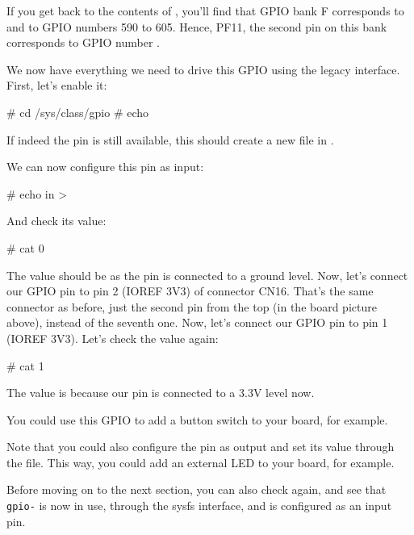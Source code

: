       If you get back to the contents of , you'll
      find that GPIO bank F corresponds to  and to GPIO
      numbers 590 to 605. Hence, PF11, the second pin on this bank corresponds to
      GPIO number \gpionum.
\fi

We now have everything we need to drive this GPIO using the legacy
interface. First, let's enable it:

\begin{bashinput}
# cd /sys/class/gpio
# echo %
\end{bashinput}

If indeed the pin is still available, this should create a new
\code{\gpioname} file in .

We can now configure this pin as input:

\begin{bashinput}
# echo in > %
\end{bashinput}

And check its value:

\begin{bashinput}
# cat %
0
\end{bashinput}

The value should be  as the pin is connected to a ground level.
\if{}
      Now, let's connect our GPIO pin to pin 2 (IOREF 3V3) of connector CN16.
      That's the same connector as before, just the second pin from the top
      (in the board picture above), instead of the seventh one.
\fi
\if{}
      Now, let's connect our GPIO pin to pin 1 (IOREF 3V3).
\fi
Let's check the value again:

\begin{bashinput}
# cat %
1
\end{bashinput}

The value is  because our pin is connected to a 3.3V level now.

You could use this GPIO to add a button switch to your board, for
example.

Note that you could also configure the pin as output and set its value
through the  file. This way, you could add an external LED
to your board, for example.

Before moving on to the next section, you can also check
 again, and see that {\tt gpio-\gpionum} is now
in use, through the sysfs interface, and is configured as an input pin.

